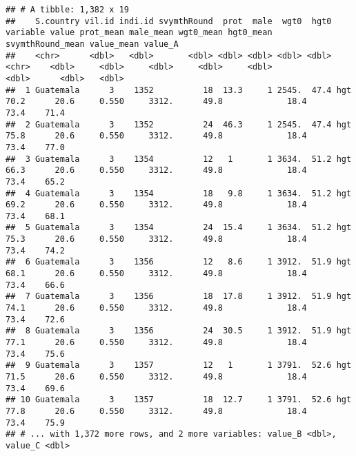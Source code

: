 \documentclass[
]{book}
\newenvironment{Shaded}{\begin{snugshade}}{\end{snugshade}}
\newcommand{\DataTypeTok}[1]{\textcolor[rgb]{0.13,0.29,0.53}{#1}}
\newcommand{\DecValTok}[1]{\textcolor[rgb]{0.00,0.00,0.81}{#1}}
\newcommand{\KeywordTok}[1]{\textcolor[rgb]{0.13,0.29,0.53}{\textbf{#1}}}
\newcommand{\NormalTok}[1]{#1}
\newcommand{\OperatorTok}[1]{\textcolor[rgb]{0.81,0.36,0.00}{\textbf{#1}}}
\begin{document}
\begin{verbatim}
## # A tibble: 1,382 x 19
##    S.country vil.id indi.id svymthRound  prot  male  wgt0  hgt0 variable value prot_mean male_mean wgt0_mean hgt0_mean svymthRound_mean value_mean value_A
##    <chr>      <dbl>   <dbl>       <dbl> <dbl> <dbl> <dbl> <dbl> <chr>    <dbl>     <dbl>     <dbl>     <dbl>     <dbl>            <dbl>      <dbl>   <dbl>
##  1 Guatemala      3    1352          18  13.3     1 2545.  47.4 hgt       70.2      20.6     0.550     3312.      49.8             18.4       73.4    71.4
##  2 Guatemala      3    1352          24  46.3     1 2545.  47.4 hgt       75.8      20.6     0.550     3312.      49.8             18.4       73.4    77.0
##  3 Guatemala      3    1354          12   1       1 3634.  51.2 hgt       66.3      20.6     0.550     3312.      49.8             18.4       73.4    65.2
##  4 Guatemala      3    1354          18   9.8     1 3634.  51.2 hgt       69.2      20.6     0.550     3312.      49.8             18.4       73.4    68.1
##  5 Guatemala      3    1354          24  15.4     1 3634.  51.2 hgt       75.3      20.6     0.550     3312.      49.8             18.4       73.4    74.2
##  6 Guatemala      3    1356          12   8.6     1 3912.  51.9 hgt       68.1      20.6     0.550     3312.      49.8             18.4       73.4    66.6
##  7 Guatemala      3    1356          18  17.8     1 3912.  51.9 hgt       74.1      20.6     0.550     3312.      49.8             18.4       73.4    72.6
##  8 Guatemala      3    1356          24  30.5     1 3912.  51.9 hgt       77.1      20.6     0.550     3312.      49.8             18.4       73.4    75.6
##  9 Guatemala      3    1357          12   1       1 3791.  52.6 hgt       71.5      20.6     0.550     3312.      49.8             18.4       73.4    69.6
## 10 Guatemala      3    1357          18  12.7     1 3791.  52.6 hgt       77.8      20.6     0.550     3312.      49.8             18.4       73.4    75.9
## # ... with 1,372 more rows, and 2 more variables: value_B <dbl>, value_C <dbl>
\end{verbatim}

\begin{Shaded}
\end{Shaded}
\end{document}
